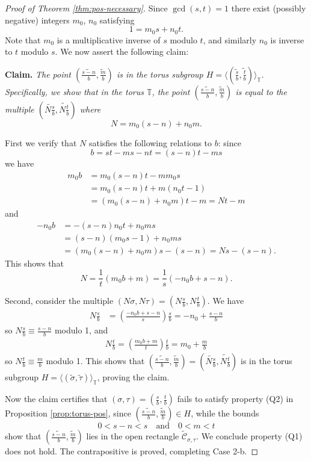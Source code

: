 \documentclass[11pt, letterpaper, reqno]{amsart}
\theoremstyle{definition}
\numberwithin{equation}{section}
\newcommand{\TT}{\mathbb{T}}
\newcommand{\cCbar}{\widetilde{\mathcal{C}}}
\newcommand{\talpha}{{\sigma}}
\newcommand{\trho}{{\tau}}
\begin{document}
{\begin{proof}[Proof of Theorem \ref{thm:pos-necessary}]
Since $\gcd(s, t)=1$ there exist  (possibly negative) integers $m_0$, $n_0$  satisfying
\[ 
1 = m_0 s + n_0 t .
\]
Note that  $m_0$ is a multiplicative inverse of $s$ modulo $t$, 
and similarly  $n_0$ is inverse to $t$ modulo $s$.
We now assert the following claim:
 
{\bf Claim.}  {\em The point  $(\widetilde{\frac{s-n}{b}}, \widetilde{\frac{m}{b}})$ is in the torus subgroup 
$H = \langle (\widetilde{\frac{s}{b}}, \widetilde{\frac{t}{b}})\rangle_{\TT}$.
Specifically, we  show that in the torus $\TT$, 
the point $(\widetilde{\frac{s-n}{b}}, \widetilde{\frac{m}{b}})$ is equal to the multiple 
$(\widetilde{N\frac{s}{b}},\widetilde{N\frac{t}{b}})$
where 
$$N = m_0(s-n) + n_0 m .$$}

First we verify that $N$ satisfies the following relations to $b$: since 
$$b = st - ms - nt = (s-n)t - ms  $$
we have 
\begin{align*} 
m_0 b &=  m_0(s-n)t  -m m_0 s \\
&=  m_0(s-n)t + m(n_0 t-1)  \\
&= ( m_0 (s - n) + n_0 m )t -m = Nt - m
\end{align*}
and
\begin{align*}
-n_0 b  &= - (s-n)n_0 t + n_0 m s \\
&= (s-n)(m_0 s -1) + n_0 m s  \\
&= ( m_0(s-n) + n_0m) s - (s-n) = Ns - (s-n).
\end{align*}
This shows that
$$ N = \frac{1}{t}(m_0b +m) = \frac{1}{s} (-n_0b + s-n) .$$

Second,  consider the multiple 
$(N\talpha,N\trho) = (N\frac{s}{b}, N\frac{t}{b})$. 
We have
\begin{align*}
N\frac{s}{b} &= \left(\frac{-n_0b+s-n}{s}\right) \frac{s}{b} = -n_0 + \frac{s-n}{b}
\end{align*}
so $N\frac{s}{b} \equiv \frac{s-n}{b}$ modulo 1,
and
\begin{align*}
N\frac{t}{b} = \left(\frac{m_0 b+m}{t}\right) \frac{t}{b}
= m_0 + \frac{m}{b}
\end{align*}
so $N\frac{t}{b} \equiv \frac{m}{b}$ modulo 1.
This shows that $(\widetilde{\frac{s-n}{b}}, \widetilde{\frac{m}{b}}) 
= (\widetilde{N\frac{s}{b}},\widetilde{N\frac{t}{b}})$ 
is in the torus subgroup 
$H = \langle(\widetilde{\talpha}, \widetilde{\trho}) \rangle_{\TT}$,
proving the claim. 

Now the claim certifies that 
$(\talpha, \trho) = (\frac{s}{b}, \frac{t}{b})$ fails to satisfy property
(Q2) in Proposition \ref{prop:torus-pos}, since 
$(\widetilde{\frac{s-n}{b}}, \widetilde{\frac{m}{b}}) \in H$,
while the bounds
$$ 0 < s-n < s \quad\text{and}\quad 0<m<t $$
show that  $(\widetilde{\frac{s-n}{b}}, \widetilde{\frac{m}{b}})$  
lies in the open rectangle $\cCbar_{\talpha,\trho}$.
We conclude  property  (Q1) does not hold.
The contrapositive is proved, completing Case 2-b.
\end{proof}

}
\end{document}
